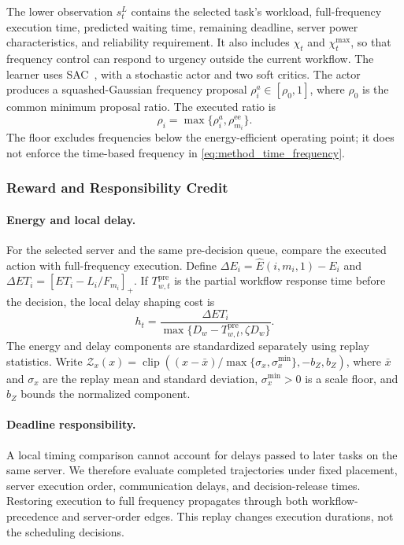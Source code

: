 \documentclass[10pt,twocolumn]{article}
\begin{document}
The lower observation $s_t^L$ contains the selected task's workload,
full-frequency execution time, predicted waiting time, remaining
deadline, server power characteristics, and reliability requirement.
It also includes $\chi_t$ and $\chi_t^{\max}$, so that frequency control
can respond to urgency outside the current workflow.
The learner uses SAC~\cite{haarnoja2018}, with a stochastic actor
and two soft critics. The actor produces a squashed-Gaussian
frequency proposal $\rho_i^a\in[\rho_0,1]$, where $\rho_0$ is the
common minimum proposal ratio. The executed ratio is
\begin{equation}
 \rho_i=\max\{\rho_i^a,\rho_{m_i}^{\mathrm{ee}}\}.
 \label{eq:method_frequency_floor}
\end{equation}
The floor excludes frequencies below the energy-efficient operating point; it
does not enforce the time-based frequency in
\eqref{eq:method_time_frequency}.

\subsubsection{Reward and Responsibility Credit}

\paragraph{Energy and local delay.}
For the selected server and the same pre-decision queue, compare the
executed action with full-frequency execution. Define
$\Delta E_i=\widehat E(i,m_i,1)-E_i$ and
$\Delta ET_i=[ET_i-L_i/F_{m_i}]_+$.
If $T_{w,t}^{\mathrm{pre}}$ is the partial workflow response time before
the decision, the local delay shaping cost is
\begin{equation}
 h_t=\frac{\Delta ET_i}{\max\{D_w-T_{w,t}^{\mathrm{pre}},\zeta D_w\}}.
 \label{eq:method_local_delay}
\end{equation}
The energy and delay components are standardized separately using
replay statistics. Write
$\mathcal Z_x(x)=\operatorname{clip}((x-\bar x)/\max\{\sigma_x,\sigma_x^{\min}\},
-b_Z,b_Z)$, where $\bar x$ and $\sigma_x$ are the replay mean and standard
deviation, $\sigma_x^{\min}>0$ is a scale floor, and $b_Z$ bounds the normalized
component.

\paragraph{Deadline responsibility.}
A local timing comparison cannot account for delays passed to later
tasks on the same server. We therefore evaluate completed trajectories
under fixed placement, server execution order, communication delays,
and decision-release times. Restoring execution to full frequency
propagates through both workflow-precedence and server-order edges.
This replay changes execution durations, not the scheduling decisions.
\end{document}

